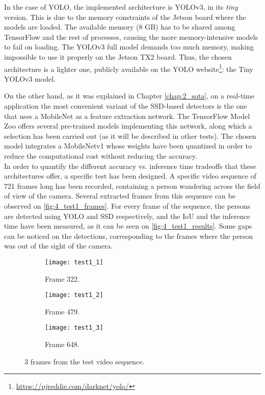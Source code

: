 In the case of YOLO, the implemented architecture is YOLOv3, in its \textit{tiny} version. This is due to the memory constraints of the Jetson board where the models are loaded. The available memory (8 GB) has to be shared among TensorFlow and the rest of processes, causing the more memory-intensive models to fail on loading. The YOLOv3 full model demands too much memory, making impossible to use it properly on the Jetson TX2 board. Thus, the chosen architecture is a lighter one, publicly available on the YOLO website\footnote{\url{https://pjreddie.com/darknet/yolo/}}: the Tiny YOLOv3 model.

On the other hand, as it was explained in Chapter \ref{chap:2_sota}, on a real-time application the most convenient variant of the SSD-based detectors is the one that uses a MobileNet \cite{mobilenet} as a feature extraction network. The TensorFlow Model Zoo \cite{model_zoo} offers several pre-trained models implementing this network, along which a selection has been carried out (as it will be described in other tests). The chosen model integrates a MobileNetv1 whose weights have been quantized \cite{ssd_quantization} in order to reduce the computational cost without reducing the accuracy.\\


In order to quantify the different accuracy vs. inference time tradeoffs that these architectures offer, a specific test has been designed. A specific video sequence of 721 frames long has been recorded, containing a person wandering across the field of view of the camera. Several extracted frames from this sequence can be observed on \autoref{fig:4_test1_frames}. For every frame of the sequence, the persons are detected using YOLO and SSD respectively, and the IoU and the inference time have been measured, as it can be seen on \autoref{fig:4_test1_results}. Some gaps can be noticed on the detections, corresponding to the frames where the person was out of the sight of the camera.

\begin{figure}[h]
	\centering
	\begin{subfigure}[b]{0.3\linewidth}
		\centering
		\texttt{[image: test1\_1]}
		\caption{Frame 322.}
	\end{subfigure}
	\begin{subfigure}[b]{0.3\linewidth}
		\centering
		\texttt{[image: test1\_2]}
		\caption{Frame 479.}
	\end{subfigure}
	\begin{subfigure}[b]{0.3\linewidth}
		\centering
		\texttt{[image: test1\_3]}
		\caption{Frame 648.}
	\end{subfigure}
	\caption{3 frames from the test video sequence.}
	\label{fig:4_test1_frames}
\end{figure}



